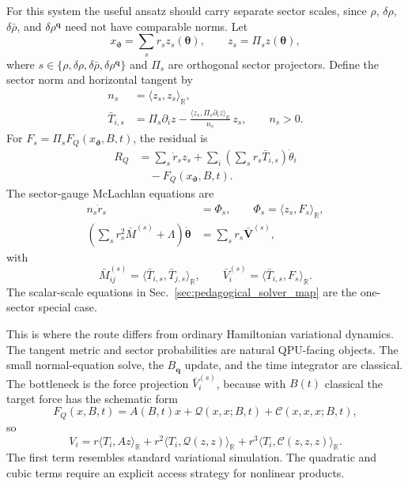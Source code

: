 \documentclass[
  reprint,
  amsmath,
  amssymb,
  aps,
  pra,
  nofootinbib,
  superscriptaddress,
  floatfix
]{revtex4-2}
\begin{document}
For this system the useful ansatz should carry separate sector scales, since
\(\rho\), \(\delta\rho\), \(\delta\bar\rho\), and
\(\delta\rho^{\mathbf q}\) need not have comparable norms.  Let
\begin{equation}
x_{\bm\vartheta}
=
\sum_s r_s z_s(\bm\theta),
\qquad
z_s=\Pi_s z(\bm\theta),
\end{equation}
where
\(s\in\{\rho,\delta\rho,\delta\bar\rho,\delta\rho^{\mathbf q}\}\) and
\(\Pi_s\) are orthogonal sector projectors.  Define the sector norm and
horizontal tangent by
\begin{align}
n_s&=\langle z_s,z_s\rangle_{\mathbb R},
\\
\bar T_{i,s}
&=
\Pi_s\partial_i z
-
\frac{
\langle z_s,\Pi_s\partial_i z\rangle_{\mathbb R}
}{n_s}\,z_s ,
\qquad n_s>0 .
\end{align}
For \(F_s=\Pi_sF_Q(x_{\bm\vartheta},B,t)\), the residual is
\begin{equation}
\begin{aligned}
R_Q
&=
\sum_s \dot r_s z_s
+
\sum_i
\left(\sum_s r_s\bar T_{i,s}\right)\dot\theta_i
\\
&\quad
-F_Q(x_{\bm\vartheta},B,t).
\end{aligned}
\label{eq:paper_v_mclachlan_residual}
\end{equation}
The sector-gauge McLachlan equations are
\begin{align}
n_s\dot r_s&=\Phi_s,
\qquad
\Phi_s=\langle z_s,F_s\rangle_{\mathbb R},
\label{eq:paper_v_sector_scale_eq}
\\
\left(
\sum_s r_s^2\bar M^{(s)}+\Lambda
\right)\dot{\bm\theta}
&=
\sum_s r_s\bar{\bm V}^{(s)},
\label{eq:paper_v_sector_theta_eq}
\end{align}
with
\begin{equation}
\bar M_{ij}^{(s)}
=
\langle\bar T_{i,s},\bar T_{j,s}\rangle_{\mathbb R},
\qquad
\bar V_i^{(s)}
=
\langle\bar T_{i,s},F_s\rangle_{\mathbb R}.
\end{equation}
The scalar-scale equations in Sec.~\ref{sec:pedagogical_solver_map} are the
one-sector special case.

This is where the route differs from ordinary Hamiltonian variational
dynamics.  The tangent metric and sector probabilities are natural QPU-facing
objects.  The small normal-equation solve, the \(B_{\mathbf q}\) update, and
the time integrator are classical.  The bottleneck is the force projection
\(\bar V_i^{(s)}\), because with \(B(t)\) classical the target force has the
schematic form
\begin{equation}
F_Q(x,B,t)
=
A(B,t)x+\mathcal Q(x,x;B,t)+\mathcal C(x,x,x;B,t),
\label{eq:paper_v_force_polynomial}
\end{equation}
so
\begin{equation}
V_i
=
r\langle T_i,Az\rangle_{\mathbb R}
+r^2\langle T_i,\mathcal Q(z,z)\rangle_{\mathbb R}
+r^3\langle T_i,\mathcal C(z,z,z)\rangle_{\mathbb R}.
\label{eq:paper_v_force_projection_layers}
\end{equation}
The first term resembles standard variational simulation.  The quadratic and
cubic terms require an explicit access strategy for nonlinear products.
\end{document}
